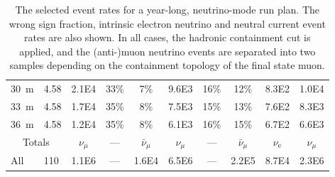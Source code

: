 \begin{table}
\begin{tabular}{ l l || c c | c || c c | c | c || c }
 30~m  &  4.58  & 2.1E4 & 33\% & 7\% & 9.6E3 & 16\% & 12\% & 8.3E2 & 1.0E4 \\
 33~m  &  4.58  & 1.7E4 & 35\% & 8\% & 7.5E3 & 15\% & 13\% & 7.6E2 & 8.3E3 \\
 36~m  &  4.58  & 1.2E4 & 35\% & 8\% & 6.1E3 & 16\% & 15\% & 6.7E2 & 6.6E3 \\
\hline
\hline
\multicolumn{2}{c||}{Totals} & $\nu_{\mu}$ & --- & $\bar{\nu}_{\mu}$ & $\nu_{\mu}$ & --- & $\bar{\nu}_{\mu}$ & $\nu_\textrm{e}$ & $\nu_{\mu}$ \\ \hline
 All  &  110  & 1.1E6 & --- & 1.6E4 & 6.5E6 & --- & 2.2E5 & 8.7E4 & 2.3E6 \\
\end{tabular}

\caption{The selected event rates for a year-long, neutrino-mode run plan. The wrong sign fraction, intrinsic electron neutrino and neutral current event rates are also shown. In all cases, the hadronic containment cut is applied, and the (anti-)muon neutrino events are separated into two samples depending on the containment topology of the final state muon.}
\label{table:evrates_LAR}
\end{table}
